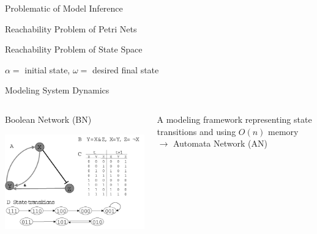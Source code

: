 \documentclass[8pt]{beamer}
\begin{document}
\begin{frame}{Problematic of Model Inference}
    \centering
    
\end{frame}

\begin{frame}{Reachability Problem of Petri Nets}
    \centering
    
\end{frame}

\begin{frame}{Reachability Problem of State Space}
    \centering
    
    
    $\alpha=$ initial state, $\omega=$ desired final state
\end{frame}


\begin{frame}{Modeling System Dynamics}
    \begin{columns}
    \begin{column}{0.45\textwidth}
    Boolean Network (BN)
    
    \vspace{0.5cm}
    \includegraphics[width=\textwidth]{figures/BooleanNetwork.png}
    \end{column}
    \pause
    \begin{column}{0.45\textwidth}
    A modeling framework representing state transitions and using $O(n)$ memory $\to$ Automata Network (AN)
    
    \pause
    \vspace{0.5cm}
    
    
    \end{column}
    \end{columns}
\end{frame}
\end{document}
